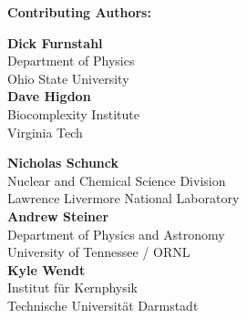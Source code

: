 {\bf \large Contributing Authors:}
\vspace{5mm}

\begin{minipage}[t]{0.5\linewidth}

\textbf{Dick Furnstahl}\\
Department of Physics\\ 
Ohio State University\\

\textbf{Dave Higdon}\\
Biocomplexity Institute\\
Virginia Tech


\end{minipage}
\hfill
\begin{minipage}[t]{0.5\linewidth}

{\bf Nicholas Schunck}\\
Nuclear and Chemical Science Division \\
Lawrence Livermore National Laboratory\\

{\bf Andrew Steiner}\\
Department of Physics and Astronomy\\
University of Tennessee / ORNL\\

{\bf Kyle Wendt}\\
Institut f\"ur Kernphysik\\
Technische Universit\"at Darmstadt \\

\end{minipage}

